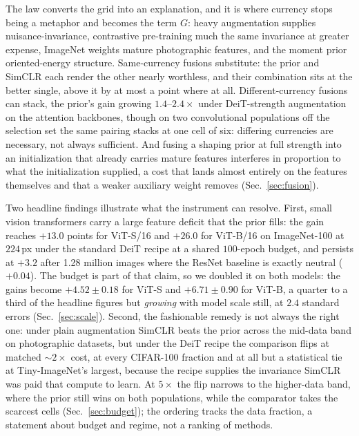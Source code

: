 The law converts the grid into an explanation, and it is where currency stops
being a metaphor and becomes the term $G$: heavy augmentation supplies
nuisance-invariance, contrastive pre-training much the same invariance at
greater expense, ImageNet weights mature photographic features, and the moment
prior oriented-energy structure. Same-currency fusions substitute: the prior
and SimCLR each render the other nearly worthless, and their combination sits
at the better single, above it by at most a point where at all. Different-currency fusions can stack, the prior's gain
growing $1.4$--$2.4\times$ under DeiT-strength augmentation on the attention
backbones, though on two convolutional populations off the selection set the
same pairing stacks
at one cell of six: differing currencies are necessary, not always
sufficient. And fusing a shaping prior at full strength into an
initialization that already carries mature features interferes in
proportion to what the initialization supplied, a cost that lands almost
entirely on the features themselves and that a weaker
auxiliary weight removes (Sec.~\ref{sec:fusion}).

Two headline findings illustrate what the instrument can resolve. First, small
vision transformers carry a large feature deficit that the prior fills: the
gain reaches $+13.0$ points for ViT-S/16 and $+26.0$ for ViT-B/16 on
ImageNet-100 at $224$\,px under the standard DeiT recipe at a shared
$100$-epoch budget, and persists at $+3.2$ after 1.28 million images where the
ResNet baseline is exactly neutral ($+0.04$). The budget is part of that claim,
so we doubled it on both models: the gains become $+4.52 \pm 0.18$ for ViT-S
and $+6.71 \pm 0.90$ for ViT-B, a quarter to a third of the headline figures but
\emph{growing} with model scale still, at $2.4$ standard errors
(Sec.~\ref{sec:scale}). Second, the fashionable remedy is
not
always the right one: under plain augmentation SimCLR beats the prior across
the mid-data band on photographic datasets, but under the DeiT recipe the
comparison flips at matched ${\sim}2\times$ cost, at every CIFAR-100 fraction
and at all but a statistical tie at Tiny-ImageNet's largest, because the
recipe supplies the invariance SimCLR was paid that compute to learn. At
$5\times$ the flip narrows to the higher-data band, where the prior still wins
on both populations, while the comparator takes the scarcest cells
(Sec.~\ref{sec:budget}); the ordering tracks the data fraction, a
statement about budget and regime, not a ranking of methods.

